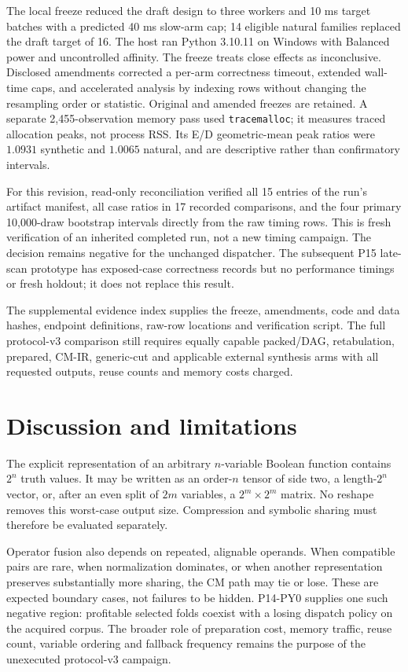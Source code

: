 \documentclass[11pt]{article}
\begin{document}
The local freeze reduced the draft design to three workers and 10 ms target
batches with a predicted 40 ms slow-arm cap; 14 eligible natural families
replaced the draft target of 16. The host ran Python 3.10.11 on Windows with
Balanced power and uncontrolled affinity. The freeze treats close effects as
inconclusive. Disclosed amendments corrected a per-arm correctness timeout,
extended wall-time caps, and accelerated analysis by indexing rows without
changing the resampling order or statistic. Original and amended freezes
are retained. A separate 2,455-observation memory pass used
\texttt{tracemalloc}; it measures traced allocation peaks, not process RSS.
Its E/D geometric-mean peak ratios were $1.0931$ synthetic and $1.0065$ natural,
and are descriptive rather than confirmatory intervals.

For this revision, read-only reconciliation verified all 15 entries of the
run's artifact manifest, all case ratios in 17 recorded comparisons, and the
four primary 10,000-draw bootstrap intervals directly from the raw timing
rows. This is fresh verification of an inherited completed run, not a new
timing campaign. The decision remains negative for the unchanged dispatcher.
The subsequent P15 late-scan prototype has exposed-case correctness records
but no performance timings or fresh holdout; it does not replace this result.

The supplemental evidence index supplies the freeze, amendments, code and
data hashes, endpoint definitions, raw-row locations and verification script.
The full protocol-v3 comparison still requires equally capable packed/DAG,
retabulation, prepared, CM-IR, generic-cut and applicable external synthesis
arms with all requested outputs, reuse counts and memory costs charged.


\section{Discussion and limitations}
\label{sec:discussion}

The explicit representation of an arbitrary $n$-variable Boolean function
contains $2^n$ truth values. It may be written as an order-$n$ tensor of side
two, a length-$2^n$ vector, or, after an even split of $2m$ variables, a
$2^m\times2^m$ matrix. No reshape removes this worst-case output size.
Compression and symbolic sharing must therefore be evaluated separately.

Operator fusion also depends on repeated, alignable operands. When compatible
pairs are rare, when normalization dominates, or when another representation
preserves substantially more sharing, the CM path may tie or lose. These are
expected boundary cases, not failures to be hidden. P14-PY0 supplies one such
negative region: profitable selected folds coexist with a losing dispatch
policy on the acquired corpus. The broader role of preparation cost, memory
traffic, reuse count, variable ordering and fallback frequency remains the
purpose of the unexecuted protocol-v3 campaign.
\end{document}
